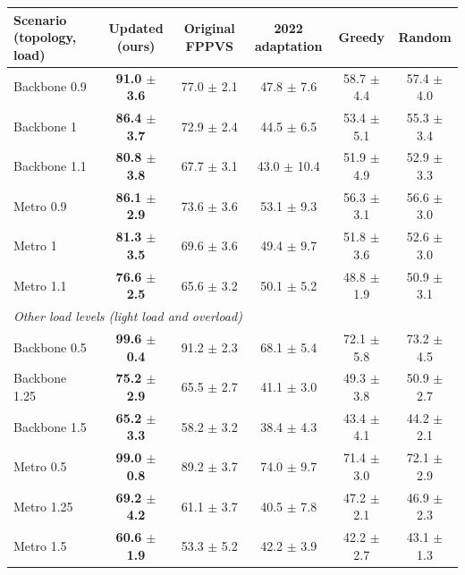 \begin{tabular}{lccccc}
\toprule
Scenario (topology, load) & Updated (ours) & Original FPPVS & 2022 adaptation & Greedy & Random \\
\midrule
Backbone 0.9 & \textbf{91.0 $\pm$ 3.6} & 77.0 $\pm$ 2.1 & 47.8 $\pm$ 7.6 & 58.7 $\pm$ 4.4 & 57.4 $\pm$ 4.0 \\
Backbone 1 & \textbf{86.4 $\pm$ 3.7} & 72.9 $\pm$ 2.4 & 44.5 $\pm$ 6.5 & 53.4 $\pm$ 5.1 & 55.3 $\pm$ 3.4 \\
Backbone 1.1 & \textbf{80.8 $\pm$ 3.8} & 67.7 $\pm$ 3.1 & 43.0 $\pm$ 10.4 & 51.9 $\pm$ 4.9 & 52.9 $\pm$ 3.3 \\
Metro 0.9 & \textbf{86.1 $\pm$ 2.9} & 73.6 $\pm$ 3.6 & 53.1 $\pm$ 9.3 & 56.3 $\pm$ 3.1 & 56.6 $\pm$ 3.0 \\
Metro 1 & \textbf{81.3 $\pm$ 3.5} & 69.6 $\pm$ 3.6 & 49.4 $\pm$ 9.7 & 51.8 $\pm$ 3.6 & 52.6 $\pm$ 3.0 \\
Metro 1.1 & \textbf{76.6 $\pm$ 2.5} & 65.6 $\pm$ 3.2 & 50.1 $\pm$ 5.2 & 48.8 $\pm$ 1.9 & 50.9 $\pm$ 3.1 \\
\midrule \multicolumn{6}{l}{\emph{Other load levels (light load and overload)}} \\
Backbone 0.5 & \textbf{99.6 $\pm$ 0.4} & 91.2 $\pm$ 2.3 & 68.1 $\pm$ 5.4 & 72.1 $\pm$ 5.8 & 73.2 $\pm$ 4.5 \\
Backbone 1.25 & \textbf{75.2 $\pm$ 2.9} & 65.5 $\pm$ 2.7 & 41.1 $\pm$ 3.0 & 49.3 $\pm$ 3.8 & 50.9 $\pm$ 2.7 \\
Backbone 1.5 & \textbf{65.2 $\pm$ 3.3} & 58.2 $\pm$ 3.2 & 38.4 $\pm$ 4.3 & 43.4 $\pm$ 4.1 & 44.2 $\pm$ 2.1 \\
Metro 0.5 & \textbf{99.0 $\pm$ 0.8} & 89.2 $\pm$ 3.7 & 74.0 $\pm$ 9.7 & 71.4 $\pm$ 3.0 & 72.1 $\pm$ 2.9 \\
Metro 1.25 & \textbf{69.2 $\pm$ 4.2} & 61.1 $\pm$ 3.7 & 40.5 $\pm$ 7.8 & 47.2 $\pm$ 2.1 & 46.9 $\pm$ 2.3 \\
Metro 1.5 & \textbf{60.6 $\pm$ 1.9} & 53.3 $\pm$ 5.2 & 42.2 $\pm$ 3.9 & 42.2 $\pm$ 2.7 & 43.1 $\pm$ 1.3 \\
\bottomrule
\end{tabular}